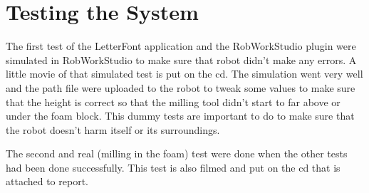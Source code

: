 \section{Testing the System}
\label{sec:test}

The first test of the LetterFont application and the RobWorkStudio plugin were simulated in RobWorkStudio to make sure that robot didn't make any errors. A little movie of that simulated test is put on the cd. The simulation went very well and the path file were uploaded to the robot to tweak some values to make sure that the height is correct so that the milling tool didn't start to far above or under the foam block. This dummy tests are important to do to make sure that the robot doesn't harm itself or its surroundings.

The second and real (milling in the foam) test were done when the other tests had been done successfully. This test is also filmed and put on the cd that is attached to report.

